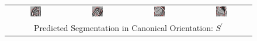 \begin{figure}
\begin{center}
\begin{tabular}{cccc}
\includegraphics[width=0.19\textwidth]{./data/failures/HCMNet_2000062/00_SAX/9/9_bbox.png} &
\includegraphics[width=0.19\textwidth]{./data/failures/HCMNet_2400044/00_SAX/2/5_bbox.png} &
\includegraphics[width=0.19\textwidth]{./data/failures/HCMNet_2600079/01_HLA/00/0_bbox.png} &
\includegraphics[width=0.19\textwidth]{./data/failures/HCMNet_2600079/02_VLA/00/0_bbox.png} \\

\multicolumn{4}{c}{Predicted Segmentation in Canonical Orientation: $S^\prime$} \\


\end{tabular}
\end{center}
\end{figure}
